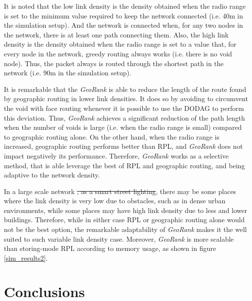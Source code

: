 \documentclass[final,authoryear,3p,twocolumn]{elsarticle}
\newcommand{\removed}{\sout}
\begin{document}
It is noted that the low link density is the density obtained when the radio range is set to the minimum value required to keep the network connected (i.e. 40m in the simulation setup). And the network is connected when, for any two nodes in the network, there is at least one path connecting them. Also, the high link density is the density obtained when the radio range is set to a value that, for every node in the network, greedy routing always works (i.e. there is no void node). Thus, the packet always is routed through the shortest path in the network (i.e. 90m in the simulation setup).

It is remarkable that the \textit{GeoRank} is able to reduce the length of the route found by geographic routing in lower link densities. It does so by avoiding to circumvent the void with face routing whenever it is possible to use the DODAG to perform this deviation. Thus, \textit{GeoRank} achieves a significant reduction of the path length when the number of voids is large (i.e. when the radio range is small) compared to geographic routing alone. On the other hand, when the radio range is increased, geographic routing performs better than RPL, and \textit{GeoRank} does not impact negatively its performance. Therefore, \textit{GeoRank} works as a selective method, that is able leverage the best of RPL and geographic routing, and being adaptive to the network density.

In a large scale network \removed{, as a smart street lighting}, there may be some places where the link density is very low due to obstacles, such as in dense urban environments, while some places may have high link density due to less and lower buildings. Therefore, while in either case RPL or geographic routing alone would not be the best option, the remarkable adaptability of \textit{GeoRank} makes it the well suited to such variable link density case. Moreover, \textit{GeoRank} is more scalable than storing-mode RPL according to memory usage, as shown in figure \ref{sim_results2}.

\section{Conclusions}
\label{secConclusion}
\end{document}

